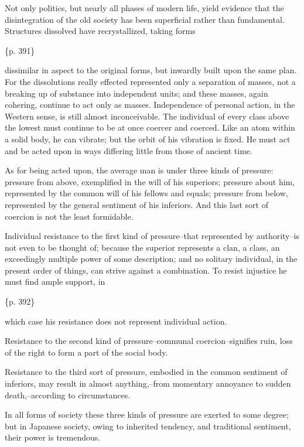 Not only politics, but nearly all phases of modern life, yield evidence that the disintegration of the old society has been superficial rather than fundamental. Structures dissolved have recrystallized, taking forms

\{p. 391\}

dissimilar in aspect to the original forms, but inwardly built upon the same plan. For the dissolutions really effected represented only a separation of masses, not a breaking up of substance into independent units; and these masses, again cohering, continue to act only as masses. Independence of personal action, in the Western sense, is still almost inconceivable. The individual of every class above the lowest must continue to be at once coercer and coerced. Like an atom within a solid body, he can vibrate; but the orbit of his vibration is fixed. He must act and be acted upon in ways differing little from those of ancient time.



As for being acted upon, the average man is under three kinds of pressure: pressure from above, exemplified in the will of his superiors; pressure about him, represented by the common will of his fellows and equals; pressure from below, represented by the general sentiment of his inferiors. And this last sort of coercion is not the least formidable.

Individual resistance to the first kind of pressure--that represented by authority--is not even to be thought of; because the superior represents a clan, a class, an exceedingly multiple power of some description; and no solitary individual, in the present order of things, can strive against a combination. To resist injustice he must find ample support, in

\{p. 392\}

which case his resistance does not represent individual action.

Resistance to the second kind of pressure--communal coercion--signifies ruin, loss of the right to form a part of the social body.

Resistance to the third sort of pressure, embodied in the common sentiment of inferiors, may result in almost anything,--from momentary annoyance to sudden death,--according to circumstances.

In all forms of society these three kinds of pressure are exerted to some degree; but in Japanese society, owing to inherited tendency, and traditional sentiment, their power is tremendous.



